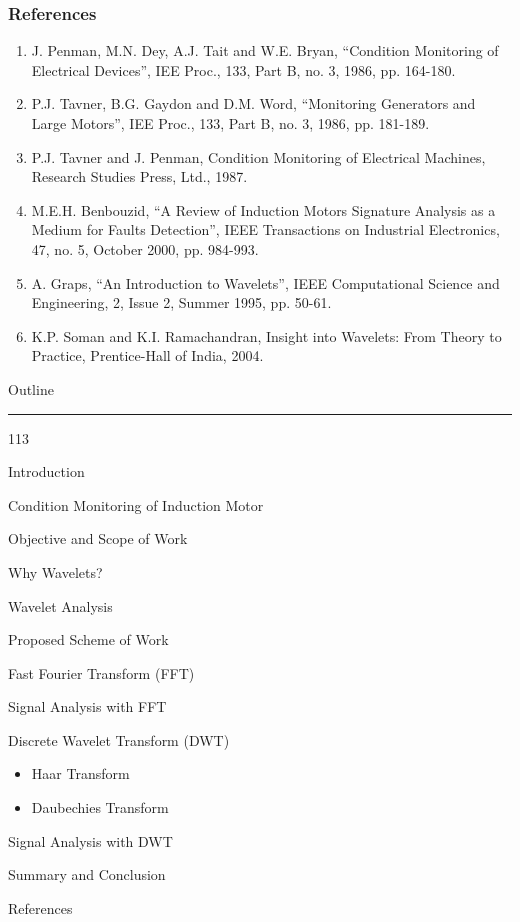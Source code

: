 \documentclass[10pt]{beamer}
\begin{document}
\begin{frame}
\frametitle{References}
	\begin{enumerate}
	\item J. Penman, M.N. Dey, A.J. Tait and W.E. Bryan, “Condition Monitoring of Electrical Devices”, IEE Proc., 133, Part B, no. 3, 1986, pp. 164-180.
	\item P.J. Tavner, B.G. Gaydon and D.M. Word, “Monitoring Generators and Large Motors”, IEE Proc., 133, Part B, no. 3, 1986, pp. 181-189.
	\item P.J. Tavner and J. Penman, Condition Monitoring of Electrical Machines, Research Studies Press, Ltd., 1987.
	\item M.E.H. Benbouzid, “A Review of Induction Motors Signature Analysis as a Medium  for  Faults  Detection”,  IEEE  Transactions on Industrial Electronics, 47, no. 5, October 2000, pp. 984-993.
	\item A. Graps, “An Introduction to Wavelets”, IEEE Computational Science and Engineering, 2, Issue 2, Summer 1995, pp. 50-61.
	\item K.P. Soman and K.I. Ramachandran, Insight into Wavelets: From Theory to Practice, Prentice-Hall of India, 2004.
	\end{enumerate}
\end{frame}


\begin{slide*}
{\large \textsf{Outline}}\\
\hrule
\vspace{10pt}
\begin{dinglist} {113}
\item Introduction
\item Condition Monitoring of Induction Motor
\item Objective and Scope of Work
\item Why Wavelets?
\item Wavelet Analysis
\item Proposed Scheme of Work
\item Fast Fourier Transform (FFT)
\item Signal Analysis with FFT
\item Discrete Wavelet Transform (DWT)
    \begin{itemize}
    \item Haar Transform
    \item Daubechies Transform
    \end{itemize}
\item Signal Analysis with DWT
\item Summary and Conclusion
\item References
\end{dinglist}
\end{slide*}
\end{document}
